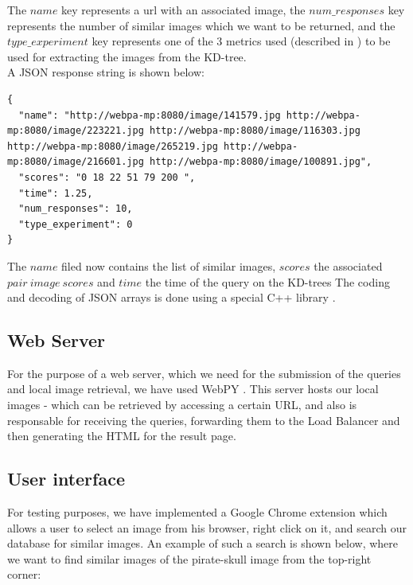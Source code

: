 The $name$ key represents a url with an associated image, the $num\_responses$ key represents the number of similar images which we want to be returned, and the $type\_experiment$ key represents one of the 3 metrics used (described in ) to be used for extracting the images from the KD-tree.\\

A JSON response string is shown below:

\begin{lstlisting}[caption=Response JSON]
{
  "name": "http://webpa-mp:8080/image/141579.jpg http://webpa-mp:8080/image/223221.jpg http://webpa-mp:8080/image/116303.jpg http://webpa-mp:8080/image/265219.jpg http://webpa-mp:8080/image/216601.jpg http://webpa-mp:8080/image/100891.jpg",
  "scores": "0 18 22 51 79 200 ",
  "time": 1.25,
  "num_responses": 10,
  "type_experiment": 0
}
\end{lstlisting}

The $name$ filed now contains the list of similar images, $scores$ the associated $pair\ image\ scores$ and $time$ the time of the query on the KD-trees The coding and decoding of JSON arrays is done using a special C++ library \cite{jsoncpp}.

\subsection{Web Server}

For the purpose of a web server, which we need for the submission of the queries and local image retrieval, we have used WebPY \cite{webpy}. This server hosts our local images - which can be retrieved by accessing a certain URL, and also is responsable for receiving the queries, forwarding them to the Load Balancer and then generating the HTML for the result page.

\subsection{User interface}

For testing purposes, we have implemented a Google Chrome extension \cite{chromeExtension} which allows a user to select an image from his browser, right click on it, and search our database for similar images. An example of such a search is shown below, where we want to find similar images of the pirate-skull image from the top-right corner: \\

